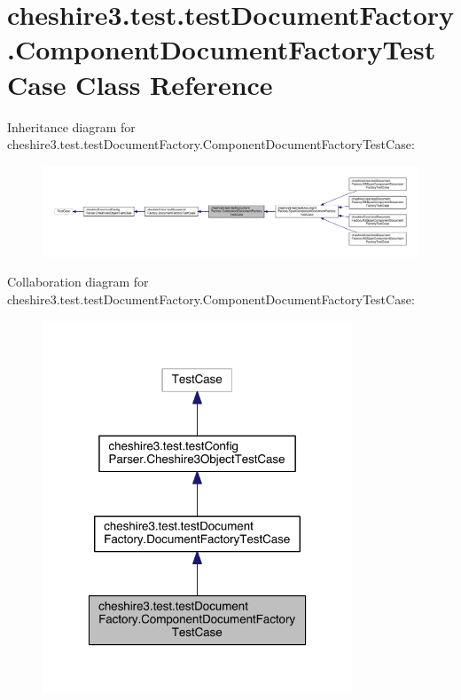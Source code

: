 \hypertarget{classcheshire3_1_1test_1_1test_document_factory_1_1_component_document_factory_test_case}{\section{cheshire3.\-test.\-test\-Document\-Factory.\-Component\-Document\-Factory\-Test\-Case Class Reference}
\label{classcheshire3_1_1test_1_1test_document_factory_1_1_component_document_factory_test_case}
}


Inheritance diagram for cheshire3.\-test.\-test\-Document\-Factory.\-Component\-Document\-Factory\-Test\-Case\-:
\nopagebreak
\begin{figure}[H]
\begin{center}
\leavevmode
\includegraphics[width=350pt]{classcheshire3_1_1test_1_1test_document_factory_1_1_component_document_factory_test_case__inherit__graph}
\end{center}
\end{figure}


Collaboration diagram for cheshire3.\-test.\-test\-Document\-Factory.\-Component\-Document\-Factory\-Test\-Case\-:
\nopagebreak
\begin{figure}[H]
\begin{center}
\leavevmode
\includegraphics[width=262pt]{classcheshire3_1_1test_1_1test_document_factory_1_1_component_document_factory_test_case__coll__graph}
\end{center}
\end{figure}
